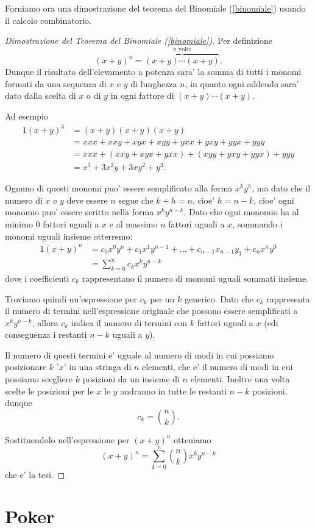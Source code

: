 Forniamo ora una dimostrazione del teorema del Binomiale (\ref{binomiale}) usando il calcolo combinatorio.
\begin{proof}[Dimostrazione del Teorema del Binomiale (\ref{binomiale})]
    Per definizione \[
        (x + y)^n = \overbrace{(x+y)\cdots (x+y)}^{n \text{ volte}}.
    \] Dunque il risultato dell'elevamento a potenza sara' la somma di tutti i monomi formati da una sequenza di $x$ e $y$ di lunghezza $n$, in quanto ogni addendo sara' dato dalla scelta di $x$ o di $y$ in ogni fattore di $(x+y)\cdots (x+y)$.

    Ad esempio \begin{alignat*}{1}
        (x+y)^3 &= (x+y)(x+y)(x+y) \\
                &= xxx + xxy + xyx + xyy + yxx + yxy + yyx + yyy\\
                &= xxx + (xxy + xyx + yxx) + (xyy + yxy + yyx) + yyy\\
                &= x^3 + 3x^2y + 3xy^2 + y^3.
    \end{alignat*}

    Ognuno di questi monomi puo' essere semplificato alla forma $x^ky^h$, ma dato che il numero di $x$ e $y$ deve essere $n$ segue che $k + h = n$, cioe' $h = n - k$, cioe' ogni monomio puo' essere scritto nella forma $x^ky^{n-k}$. Dato che ogni monomio ha al minimo 0 fattori uguali a $x$ e al massimo $n$ fattori uguali a $x$, sommando i monomi uguali insieme otterremo:
    \begin{alignat*}
        {1}
        (x+y)^n &= c_0x^0y^n + c_1x^1y^{n-1} + \dots + c_{n-1}x_{n-1}y_1 + c_nx^ny^0\\
        &= \sum_{k = 0}^n c_kx^ky^{n-k}
    \end{alignat*}
    dove i coefficienti $c_k$ rappresentano il numero di monomi uguali sommati insieme.

    Troviamo quindi un'espressione per $c_k$ per un $k$ generico. Dato che $c_k$ rappresenta il numero di termini nell'espressione originale che possono essere semplificati a $x^ky^{n-k}$, allora $c_k$ indica il numero di termini con $k$ fattori uguali a $x$ (edi conseguenza i restanti $n-k$ uguali a $y$). 
    
    Il numero di questi termini e' uguale al numero di modi in cui possiamo posizionare $k$ '$x$' in una stringa di $n$ elementi, che e' il numero di modi in cui possiamo scegliere $k$ posizioni da un insieme di $n$ elementi. Inoltre una volta scelte le posizioni per le $x$ le $y$ andranno in tutte le restanti $n-k$ posizioni, dunque \[
        c_k = \binom{n}{k}.
    \]

    Sostituendolo nell'espressione per $(x+y)^n$ otteniamo \[
        (x+y)^n = \sum_{k = 0}^n \binom{n}{k}x^ky^{n-k}
    \] che e' la tesi.
\end{proof}

\section{Poker}
